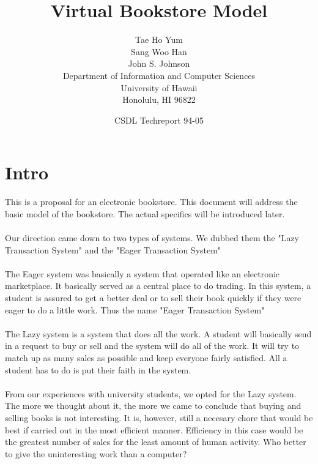                 


\noindent

\title{Virtual Bookstore Model}

\author{Tae Ho Yum\\
	Sang Woo Han\\
	John S. Johnson\\
        Department of Information and Computer Sciences\\
        University of Hawaii\\
        Honolulu, HI 96822}

\date{CSDL Techreport 94-05}


\maketitle

\section{Intro}

This is a proposal for an electronic bookstore.  This document will
address the basic model of the bookstore.  The actual specifics will
be introduced later.\\
\\
Our direction came down to two types of systems.  We dubbed them the
"Lazy Transaction System" and the "Eager Transaction System"\\
\\
The Eager system was basically a system that operated like an
electronic marketplace.  It basically served as a central place to do
trading.  In this system, a student is assured to get a better deal or
to sell their book quickly if they were eager to do a little work.
Thus the name "Eager Transaction System"\\
\\
The Lazy system is a system that does all the work.  A student will
basically send in a request to buy or sell and the system will do all
of the work.  It will try to match up as many sales as possible and
keep everyone fairly satisfied.  All a student has to do is put their
faith in the system.\\
\\
From our experiences with university students, we opted for the Lazy
system.  The more we thought about it, the more we came to conclude
that buying and selling books is not interesting.  It is, however,
still a necesary chore that would be best if carried out in the most
efficient manner.  Efficiency in this case would be the greatest
number of sales for the least amount of human activity.  Who better to
give the uninteresting work than a computer?\\

